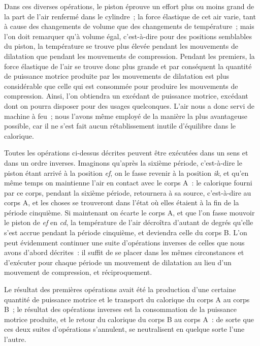\documentclass[french,twoside]{book} %
\begin{document}
\noindent Dans ces diverses opérations, le piston éprouve un effort plus ou moins grand de la part de l’air renfermé dans le cylindre ; la force élastique de cet air varie, tant à cause des changements de volume que des changements de température ; mais l’on doit remarquer qu’à volume égal, c’est-à-dire pour des positions semblables du piston, la température se trouve plus élevée pendant les mouvements de dilatation que pendant les mouvements de compression. Pendant les premiers, la force élastique de l’air se trouve donc plus grande et par conséquent la quantité de puissance motrice produite par les mouvements de dilatation est plus considérable que celle qui est consommée pour produire les mouvements de compression. Ainsi, l’on obtiendra un excédant de puissance motrice, excédant dont on pourra disposer pour des usages quelconques. L’air nous a donc servi de machine à feu ; nous l’avons même employé de la manière la plus avantageuse possible, car il ne s’est fait aucun rétablissement inutile d’équilibre dans le calorique.\par
Toutes les opérations ci-dessus décrites peuvent être exécutées dans un sens et dans un ordre inverses. Imaginons qu’après la sixième période, c’est-à-dire le piston étant arrivé à la position \emph{ef}, on le fasse revenir à la position \emph{ik}, et qu’en même temps on maintienne l’air en contact avec le corps A : le calorique fourni par ce corps, pendant la sixième période, retournera à sa source, c’est-à-dire au corps A, et les choses se trouveront dans l’état où elles étaient à la fin de la période cinquième. Si maintenant on écarte le corps A, et que l’on fasse mouvoir le piston de \emph{ef} en \emph{cd}, la température de l’air décroîtra d’autant de degrés qu’elle s’est accrue pendant la période cinquième, et deviendra celle du corps B. L’on peut évidemment continuer une suite d’opérations inverses de celles que nous avons d’abord décrites : il suffit de se placer dans les mêmes circonstances et d’exécuter pour chaque période un mouvement de dilatation au lieu d’un mouvement de compression, et réciproquement.\par
Le résultat des premières opérations avait été la production d’une certaine quantité de puissance motrice et le transport du calorique du corps A au corps B ; le résultat des opérations inverses est la consommation de la puissance motrice produite, et le retour du calorique du corps B au corps A : de sorte que ces deux suites d’opérations s’annulent, se neutralisent en quelque sorte l’une l’autre.\par
\end{document}

